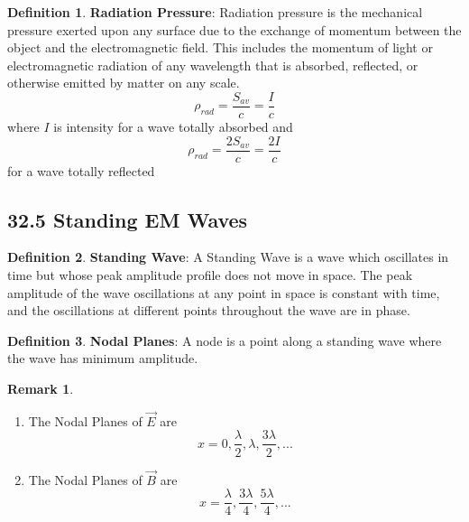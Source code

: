 \documentclass[12pt]{amsart}
\theoremstyle{definition}
\newtheorem{definition}{Definition} %
\newtheorem*{remark}{Remark}        %
\numberwithin{equation}{theorem}    %
\begin{document}
\begin{definition}
    \textbf{Radiation Pressure}:
    Radiation pressure is the mechanical pressure exerted upon any surface due to the exchange of momentum between the object and the electromagnetic field. This includes the momentum of light or electromagnetic radiation of any wavelength that is absorbed, reflected, or otherwise emitted by matter on any scale. 
    $$\rho_{rad} = \frac{S_{av}}{c} = \frac{I}{c}$$ where $I$ is intensity for a wave totally absorbed and $$\rho_{rad} = \frac{2S_{av}}{c} = \frac{2I}{c}$$ for a wave totally reflected
\end{definition}

\subsection*{32.5 Standing EM Waves}

\begin{definition}
    \textbf{Standing Wave}:
    A Standing Wave is a wave which oscillates in time but whose peak amplitude profile does not move in space. The peak amplitude of the wave oscillations at any point in space is constant with time, and the oscillations at different points throughout the wave are in phase.
\end{definition}

\begin{definition}
    \textbf{Nodal Planes}:
    A node is a point along a standing wave where the wave has minimum amplitude.
    \begin{remark}
        \begin{enumerate}
            \item The Nodal Planes of $\vec{E}$ are $$x = 0, \frac{\lambda}{2}, \lambda, 
            \frac{3\lambda}{2},...$$
            \item The Nodal Planes of $\vec{B}$ are $$x = \frac{\lambda}{4}, \frac{3\lambda}{4},
            \frac{5\lambda}{4},...$$
        \end{enumerate}
        
    \end{remark}
\end{definition}
\end{document}
